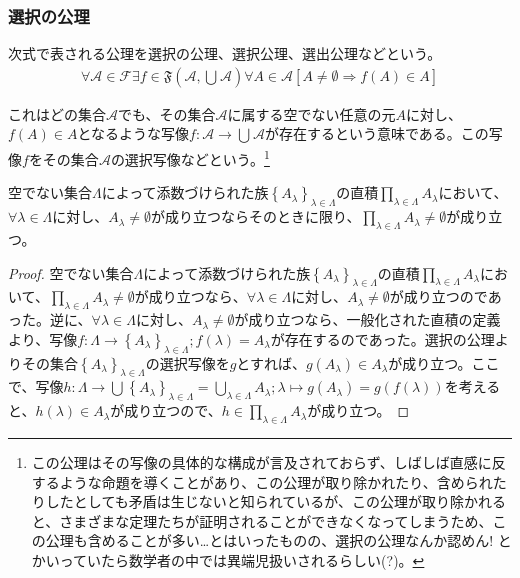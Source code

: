 \documentclass[a4paper]{jsarticle}
\begin{document}
\subsubsection{選択の公理}%
\begin{axs}
次式で表される公理を選択の公理、選択公理、選出公理などという。
\begin{align*}
\forall\mathcal{A}\in \mathcal{F\exists}f \in \mathfrak{F}\left( \mathcal{A},\bigcup_{} \mathcal{A} \right)\forall A \in \mathcal{A}\left[ A \neq \emptyset \Rightarrow f(A) \in A \right]
\end{align*}
\end{axs}
これはどの集合$\mathcal{A}$でも、その集合$\mathcal{A}$に属する空でない任意の元$A$に対し、$f(A) \in A$となるような写像$f:\mathcal{A} \rightarrow \bigcup_{} \mathcal{A}$が存在するという意味である。この写像$f$をその集合$\mathcal{A}$の選択写像などという。\footnote{この公理はその写像の具体的な構成が言及されておらず、しばしば直感に反するような命題を導くことがあり、この公理が取り除かれたり、含められたりしたとしても矛盾は生じないと知られているが、この公理が取り除かれると、さまざまな定理たちが証明されることができなくなってしまうため、この公理も含めることが多い…とはいったものの、選択の公理なんか認めん! とかいっていたら数学者の中では異端児扱いされるらしい(?)。}
\begin{thm}
\label{1.2.1.22}
空でない集合$\varLambda$によって添数づけられた族$\left\{ A_{\lambda} \right\}_{\lambda \in \varLambda}$の直積$\prod_{\lambda \in \varLambda} A_{\lambda}$において、$\forall\lambda \in \varLambda$に対し、$A_{\lambda} \neq \emptyset$が成り立つならそのときに限り、$\prod_{\lambda \in \varLambda} A_{\lambda} \neq \emptyset$が成り立つ。
\end{thm}
\begin{proof}
空でない集合$\varLambda$によって添数づけられた族$\left\{ A_{\lambda} \right\}_{\lambda \in \varLambda}$の直積$\prod_{\lambda \in \varLambda} A_{\lambda}$において、$\prod_{\lambda \in \varLambda} A_{\lambda} \neq \emptyset$が成り立つなら、$\forall\lambda \in \varLambda$に対し、$A_{\lambda} \neq \emptyset$が成り立つのであった。逆に、$\forall\lambda \in \varLambda$に対し、$A_{\lambda} \neq \emptyset$が成り立つなら、一般化された直積の定義より、写像$f:\varLambda \rightarrow \left\{ A_{\lambda} \right\}_{\lambda \in \varLambda};f(\lambda) = A_{\lambda}$が存在するのであった。選択の公理よりその集合$\left\{ A_{\lambda} \right\}_{\lambda \in \varLambda}$の選択写像を$g$とすれば、$g\left( A_{\lambda} \right) \in A_{\lambda}$が成り立つ。ここで、写像$h:\varLambda \rightarrow \bigcup_{} \left\{ A_{\lambda} \right\}_{\lambda \in \varLambda} = \bigcup_{\lambda \in \varLambda} A_{\lambda};\lambda \mapsto g\left( A_{\lambda} \right) = g\left( f(\lambda) \right)$を考えると、$h(\lambda) \in A_{\lambda}$が成り立つので、$h \in \prod_{\lambda \in \varLambda} A_{\lambda}$が成り立つ。
\end{proof}
\end{document}
